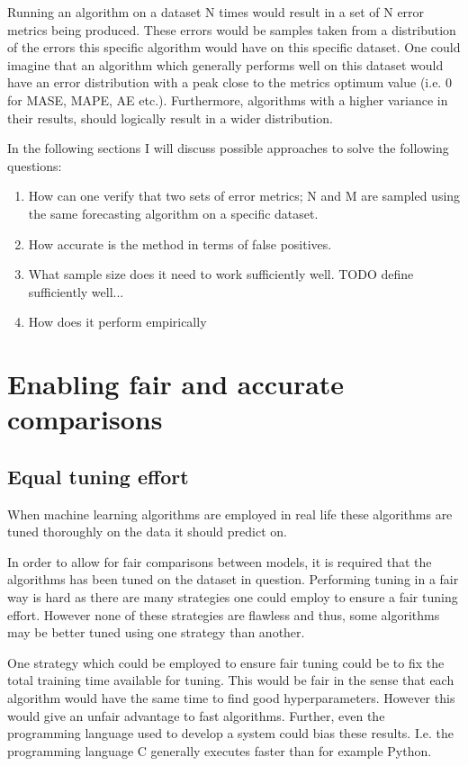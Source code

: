 Running an algorithm on a dataset N  times would result in a set of N error metrics being produced. These errors would be samples taken from a distribution of the errors this specific algorithm would have on this specific dataset. One could imagine that an algorithm which generally performs well on this dataset would have an error distribution with a peak close to the metrics optimum value (i.e. 0 for MASE, MAPE, AE etc.). Furthermore, algorithms with a higher variance in their results, should logically result in a wider distribution. 

In the following sections I will discuss possible approaches to solve the following questions:

\begin{enumerate}
    \item How can one verify that two sets of error metrics; N and M are sampled using the same forecasting algorithm on a specific dataset.
    \item How accurate is the method in terms of false positives.
    \item What sample size does it need to work sufficiently well. TODO define sufficiently well...
    \item How does it perform empirically 
\end{enumerate}

\section{Enabling fair and accurate comparisons}
\label{sec:fair_and_accurate_comparisons}
\subsection{Equal tuning effort}
\label{subsec:equal_tuning}
When machine learning algorithms are employed in real life these algorithms are tuned thoroughly on the data it should predict on. 

In order to allow for fair comparisons between models, it is required that the algorithms has been tuned on the dataset in question. Performing tuning in a fair way is hard as there are many strategies one could employ to ensure a fair tuning effort. However none of these strategies are flawless and thus, some algorithms may be better tuned using one strategy than another. 

One strategy which could be employed to ensure fair tuning could be to fix the total training time available for tuning. This would be fair in the sense that each algorithm would have the same time to find good hyperparameters. However this would give an unfair advantage to fast algorithms. Further, even the programming language used to develop a system could bias these results. I.e. the programming language C generally executes faster than for example Python.

